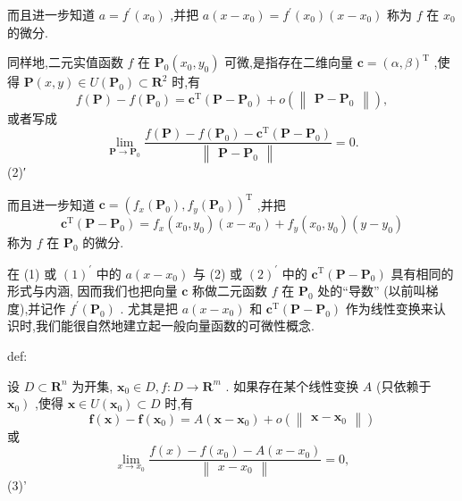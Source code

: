而且进一步知道 \(a = {f}^{\prime }\left( {x}_{0}\right)\) ,并把 \(a\left( {x - {x}_{0}}\right)  = {f}^{\prime }\left( {x}_{0}\right) \left( {x - {x}_{0}}\right)\) 称为 \(f\) 在 \({x}_{0}\) 的微分.

同样地,二元实值函数 \(f\) 在 \({\mathbf{P}}_{0}\left( {{x}_{0},{y}_{0}}\right)\) 可微,是指存在二维向量 \(\mathbf{c} = {\left( \alpha ,\beta \right) }^{\mathrm{T}}\) ,使得 \(\mathbf{P}\left( {x,y}\right)  \in  U\left( {\mathbf{P}}_{0}\right)  \subset  {\mathbf{R}}^{2}\) 时,有
\[
f\left( \mathbf{P}\right)  - f\left( {\mathbf{P}}_{0}\right)  = {\mathbf{c}}^{\mathrm{T}}\left( {\mathbf{P} - {\mathbf{P}}_{0}}\right)  + o\left( \begin{Vmatrix}{\mathbf{P} - {\mathbf{P}}_{0}}\end{Vmatrix}\right) , \tag{2}
\]
或者写成
\[
\mathop{\lim }\limits_{{\mathbf{P} \rightarrow  {\mathbf{P}}_{0}}}\frac{f\left( \mathbf{P}\right)  - f\left( {\mathbf{P}}_{0}\right)  - {\mathbf{c}}^{\mathrm{T}}\left( {\mathbf{P} - {\mathbf{P}}_{0}}\right) }{\begin{Vmatrix}\mathbf{P} - {\mathbf{P}}_{0}\end{Vmatrix}} = 0.
\]
 (2)′

而且进一步知道 \(\mathbf{c} = {\left( {f}_{x}\left( {\mathbf{P}}_{0}\right) ,{f}_{y}\left( {\mathbf{P}}_{0}\right) \right) }^{\mathrm{T}}\) ,并把
\[
{\mathbf{c}}^{\mathrm{T}}\left( {\mathbf{P} - {\mathbf{P}}_{0}}\right)  = {f}_{x}\left( {{x}_{0},{y}_{0}}\right) \left( {x - {x}_{0}}\right)  + {f}_{y}\left( {{x}_{0},{y}_{0}}\right) \left( {y - {y}_{0}}\right)
\]
称为 \(f\) 在 \({\mathbf{P}}_{0}\) 的微分.

在 (1) 或 \({\left( 1\right) }^{\prime }\) 中的 \(a\left( {x - {x}_{0}}\right)\) 与 (2) 或 \({\left( 2\right) }^{\prime }\) 中的 \({\mathbf{c}}^{\mathrm{T}}\left( {\mathbf{P} - {\mathbf{P}}_{0}}\right)\) 具有相同的形式与内涵, 因而我们也把向量 \(\mathbf{c}\) 称做二元函数 \(f\) 在 \({\mathbf{P}}_{0}\) 处的“导数” (以前叫梯度),并记作 \({f}^{\prime }\left( {\mathbf{P}}_{0}\right)\) . 尤其是把 \(a\left( {x - {x}_{0}}\right)\) 和 \({\mathbf{c}}^{\mathrm{T}}\left( {\mathbf{P} - {\mathbf{P}}_{0}}\right)\) 作为线性变换来认识时,我们能很自然地建立起一般向量函数的可微性概念.

\begin{definition}{}{def:}

\end{definition}
设 \(D \subset  {\mathbf{R}}^{n}\) 为开集, \({\mathbf{x}}_{0} \in  D,f : D \rightarrow  {\mathbf{R}}^{m}\) . 如果存在某个线性变换 \(A\) (只依赖于 \(\left. {\mathbf{x}}_{0}\right)\) ,使得 \(\mathbf{x} \in  U\left( {\mathbf{x}}_{0}\right)  \subset  D\) 时,有
\[
\mathbf{f}\left( \mathbf{x}\right)  - \mathbf{f}\left( {\mathbf{x}}_{0}\right)  = A\left( {\mathbf{x} - {\mathbf{x}}_{0}}\right)  + o\left( \begin{Vmatrix}{\mathbf{x} - {\mathbf{x}}_{0}}\end{Vmatrix}\right)  \tag{3}
\]
或
\[
\mathop{\lim }\limits_{{x \rightarrow  {x}_{0}}}\frac{f\left( x\right)  - f\left( {x}_{0}\right)  - A\left( {x - {x}_{0}}\right) }{\begin{Vmatrix}x - {x}_{0}\end{Vmatrix}} = 0,
\]
 (3)'

